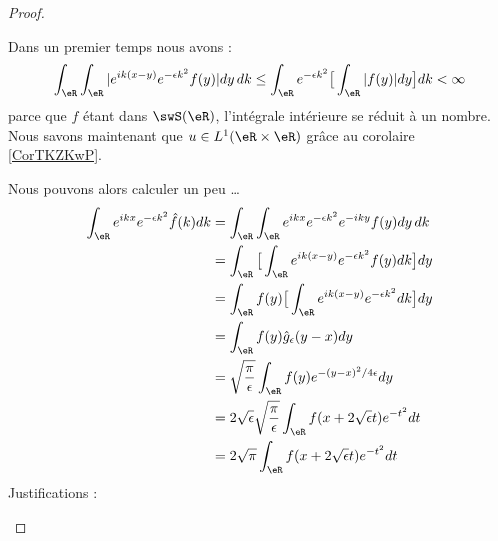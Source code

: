 \begin{proof}
\begin{subproof}
		\begin{subproof}
			\spitem[\( u\in L^1(\eR\times \eR)\)]
			Dans un premier temps nous avons :
			\begin{equation}
				\int_{\eR}\int_{\eR}|  e^{ik(x-y)} e^{-\epsilon k^2} f(y) |dy\,dk\leq \int_{\eR} e^{-\epsilon k^2} \big[  \int_{\eR}| f(y) |   dy \big] dk<\infty
			\end{equation}
			parce que \( f\) étant dans \( \swS(\eR)\), l'intégrale intérieure se réduit à un nombre. Nous savons maintenant que \( u\in L^1(\eR\times \eR)\) grâce au corolaire \ref{CorTKZKwP}.

			\spitem[Calcul]

			Nous pouvons alors calculer un peu \ldots
			\begin{subequations}
				\begin{align}
					\int_{\eR} e^{ikx} e^{-\epsilon k^2}\hat f(k)dk & =\int_{\eR}\int_{\eR} e^{ikx} e^{-\epsilon k^2} e^{-iky}f(y)dy\,dk                                                             \\
					                                                & =\int_{\eR}\big[ \int_{\eR} e^{ik(x-y)} e^{-\epsilon k^2}f(y)dk \big]dy    \label{SUBEQooYJATooBdisqE}                         \\
					                                                & =\int_{\eR}f(y)\big[   \int_{\eR} e^{ik(x-y)} e^{-\epsilon k^2}dk  \big]dy                                                     \\
					                                                & =\int_{\eR} f(y)\hat g_{\epsilon}(y-x)dy   \label{SUBEQooXLLMooQazBnM}                                                         \\
					                                                & =\sqrt{ \frac{ \pi }{ \epsilon } }\int_{\eR}f(y) e^{-(y-x)^2/4\epsilon}dy\label{SUBEQooOPQNooPofmvh}                           \\
					                                                & =2\sqrt{ \epsilon }\sqrt{ \frac{ \pi }{ \epsilon } }\int_{\eR}f(x+2\sqrt{ \epsilon }t) e^{-t^2}dt  \label{SUBEQooONHGooNoiBru} \\
					                                                & =2\sqrt{ \pi }\int_{\eR}f(x+2\sqrt{ \epsilon }t) e^{-t^2}dt                                                                    \\
				\end{align}
			\end{subequations}
			Justifications  :
			\begin{itemize}

\end{itemize}
\end{subproof}
\end{subproof}
\end{proof}
